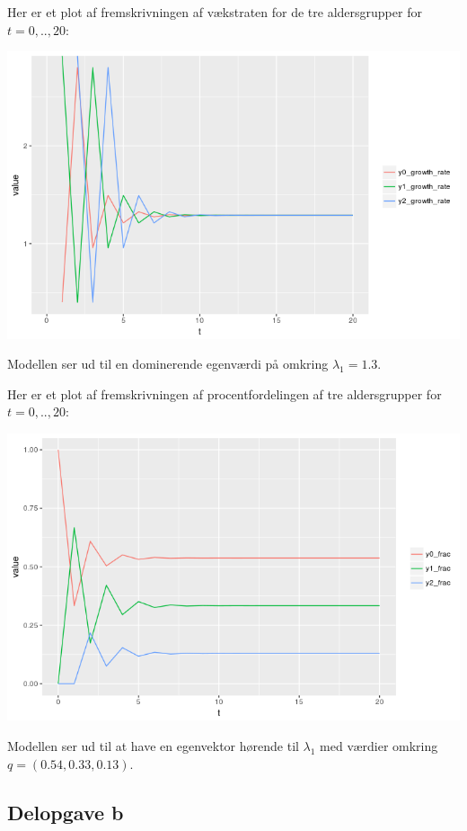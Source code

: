 \documentclass[12pt]{article}
\begin{document}
Her er et plot af fremskrivningen af vækstraten for de tre aldersgrupper for $t=0,..,20$:
\begin{center}
\includegraphics[scale=0.5]{q3p4.png}
\end{center}
Modellen ser ud til en dominerende egenværdi på omkring $\lambda_1=1.3$.

Her er et plot af fremskrivningen af procentfordelingen af tre aldersgrupper for $t=0,..,20$:
\begin{center}
\includegraphics[scale=0.5]{q3p3.png}
\end{center}
Modellen ser ud til at have en egenvektor hørende til $\lambda_1$ med værdier omkring $q=(0.54, 0.33, 0.13)$.

\subsection{Delopgave b}
\end{document}
